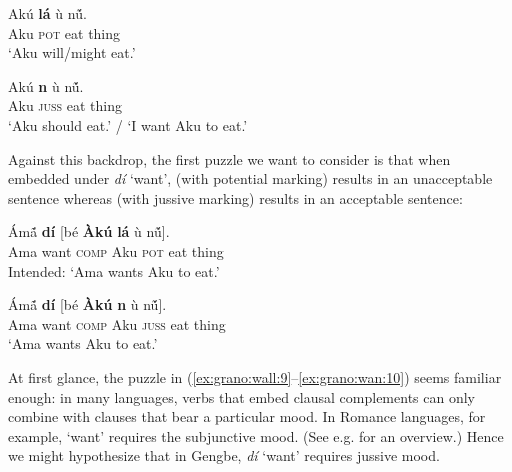 \documentclass[output=paper,modfonts,nonflat]{langsci/langscibook}
\begin{document}
\ea \label{ex:grano:pot:7}
\gll Ak\'u \textbf{l\'a} {\D}\`u n\'{\~u}.\\
Aku \textsc{pot} eat thing\\
\glt `Aku will/might eat.' %
\z

\ea \label{ex:grano:juss:8}
\gll Ak\'u \textbf{n{\É}} {\D}\`u n\'{\~u}.\\
Aku \textsc{juss} eat thing\\
\glt`Aku should eat.' / `I want Aku to eat.' %
\z

Against this backdrop, the first puzzle we want to consider is that when embedded under \emph{d{\Z}\'i} `want',  (with potential marking) results in an unacceptable sentence whereas  (with jussive marking) results in an acceptable sentence:

\ea \label{ex:grano:wall:9}
\gll *\'Am\'{\~a} \textbf{d{\Z}\'i} [b\'e \textbf{\`Ak\'u} \textbf{l\'a} {\D}\`u n\'{\~u}].\\
Ama want \textsc{comp} Aku \textsc{pot} eat thing\\
\glt Intended: `Ama wants Aku to eat.' %
\z

\ea \label{ex:grano:wan:10}
\gll \'Am\'{\~a} \textbf{d{\Z}\'i} [b\'e \textbf{\`Ak\'u} \textbf{n{\É}} {\D}\`u n\'{\~u}].\\
Ama want \textsc{comp} Aku \textsc{juss} eat thing\\
\glt `Ama wants Aku to eat.' %
\z

At first glance, the puzzle in (\ref{ex:grano:wall:9}--\ref{ex:grano:wan:10}) seems familiar enough: in many languages, verbs that embed clausal complements can only combine with clauses that bear a particular mood. In Romance languages, for example, `want' requires the subjunctive mood. (See e.g. \citealt{Palmer2001} for an overview.) Hence we might hypothesize that in Gengbe, \emph{d{\Z}\'i} `want' requires jussive mood. 
\end{document}
